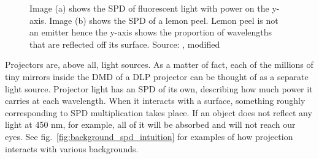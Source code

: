 \begin{figure}
    \centering
    \begin{subfigure}[b]{0.49\textwidth}
        \centering
        \def\svgwidth{\textwidth}
        
        \caption{}
    \end{subfigure}
    \hfill
    \begin{subfigure}[b]{0.49\textwidth}
        \centering
        \def\svgwidth{\textwidth}
        
        \caption{}
    \end{subfigure}
    \caption{Image (a) shows the SPD of fluorescent light with power on the y-axis. Image (b) shows the SPD of a lemon peel. Lemon peel is not an emitter hence the y-axis shows the proportion of wavelengths that are reflected off its surface. Source: \citet{PBRT3e}, modified}
    \label{fig:background_spd}
\end{figure}

Projectors are, above all, light sources. As a matter of fact, each of the millions of tiny mirrors inside the DMD of a DLP projector can be thought of as a separate light source. Projector light has an SPD of its own, describing how much power it carries at each wavelength. When it interacts with a surface, something roughly corresponding to SPD multiplication takes place. If an object does not reflect any light at 450 nm, for example, all of it will be absorbed and will not reach our eyes. See fig.~\ref{fig:background_spd_intuition} for examples of how projection interacts with various backgrounds.


